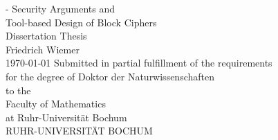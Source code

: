 \thispagestyle{empty}
{
    \calccentering{\unitlength}
    \begin{adjustwidth*}{\unitlength}{-\unitlength}
        \raggedleft{}
        {\Huge\color{Burgundy}%
        Security Arguments and\\
        Tool-based Design of Block Ciphers}\\[\baselineskip]
        {\LARGE%
        Dissertation Thesis}\\[0.2\textheight]
        {\huge%
        Friedrich Wiemer}\\[\baselineskip]
        {\LARGE%
        \today}
        \vfill
        \vfill
        {\large%
        Submitted in partial fulfillment of the requirements\\
        for the degree of Doktor der Naturwissenschaften\\[\baselineskip]%

        to the\\[\baselineskip]

        Faculty of Mathematics\\
        at Ruhr-Universität Bochum\\[2\baselineskip]


        \vfill
        }
        {%
        \LARGE%
        RUHR-UNIVERSITÄT BOCHUM}
        \vspace*{\baselineskip}
    \end{adjustwidth*}
}

\clearpage{}

